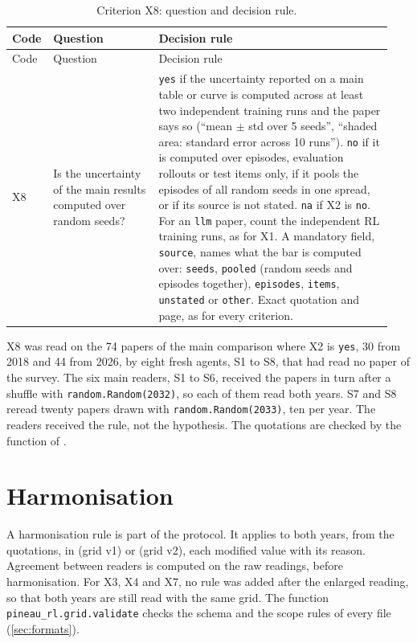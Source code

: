 \begin{small}
\begin{longtable}{@{}p{0.07\linewidth}>{\raggedright\arraybackslash}p{0.27\linewidth}>{\raggedright\arraybackslash}p{0.6\linewidth}@{}}
\caption{Criterion X8: question and decision rule.}\label{tab:a-grille-x8}\\
\toprule
Code & Question & Decision rule \\
\midrule
\endfirsthead
\toprule
Code & Question & Decision rule \\
\midrule
\endhead
\bottomrule
\endfoot
X8 & Is the uncertainty of the main results computed over random seeds? &
  \texttt{yes} if the uncertainty reported on a main table or curve is computed across at least two
  independent training runs and the paper says so (\enquote{mean $\pm$ std over 5 seeds},
  \enquote{shaded area: standard error across 10 runs}). \texttt{no} if it is computed over
  episodes, evaluation rollouts or test items only, if it pools the episodes of all random seeds in
  one spread, or if its source is not stated. \texttt{na} if X2 is \texttt{no}. For an \texttt{llm}
  paper, count the independent RL training runs, as for X1. A mandatory field, \texttt{source},
  names what the bar is computed over: \texttt{seeds}, \texttt{pooled} (random seeds and episodes
  together), \texttt{episodes}, \texttt{items}, \texttt{unstated} or \texttt{other}. Exact quotation
  and page, as for every criterion. \\
\end{longtable}
\end{small}

X8 was read on the 74 papers of the main comparison where X2 is \texttt{yes}, 30 from 2018 and 44
from 2026, by eight fresh agents, S1 to S8, that had read no paper of the survey. The six main readers, S1 to
S6, received the papers in turn after a shuffle with \texttt{random.Random(2032)}, so each of them
read both years. S7 and S8 reread twenty papers drawn with \texttt{random.Random(2033)}, ten per
year. The readers received the rule, not the hypothesis. The quotations are checked by the function
of .

\section{Harmonisation}
\label{sec:a-harmonisation}

A harmonisation rule is part of the protocol. It applies to both years, from the quotations, in  (grid v1) or
 (grid v2), each modified value with its reason. Agreement between
readers is computed on the raw readings, before harmonisation. For X3, X4 and X7, no rule was added
after the enlarged reading, so that both years are still read with the same grid. The
function \texttt{pineau\_rl.grid.validate} checks the schema and the scope rules of every file
(\cref{sec:formats}).
